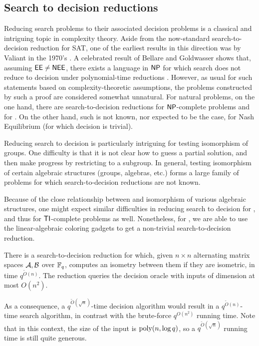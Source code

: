 \subsection{Search to decision reductions} 
Reducing search problems to their associated decision problems 
is a classical and intriguing topic in complexity 
theory. Aside from the now-standard search-to-decision reduction for SAT, one of the earliest results in this direction was by Valiant in the 1970's \cite{valiant}. A celebrated 
result of Bellare and Goldwasser shows that, assuming $\mathsf{EE}\neq\mathsf{NEE}$, there exists a language in $\mathsf{NP}$ for 
which search does not reduce to decision under polynomial-time reductions 
\cite{BG94}. 
However, as usual for such statements based on complexity-theoretic assumptions, 
the problems constructed by such a proof are considered somewhat unnatural. For 
natural problems, on the one hand, there are search-to-decision reductions for 
$\mathsf{NP}$-complete problems and for \GI. On the other hand, such is not 
known, nor expected to be the case, for Nash Equilibrium  \cite{CDT09} (for which decision is 
trivial). 

Reducing search to decision is particularly intriguing for testing isomorphism 
of groups. One difficulty is that it is not clear how to 
guess a partial solution, and then make progress by restricting to a 
subgroup. In general, testing isomorphism 
of certain algebraic structures (groups, algebras, etc.) forms a large family of 
problems 
for which search-to-decision reductions are not known.

Because of the close relationship between \ThreeTI and isomorphism of various 
algebraic structures, one might expect similar difficulties in reducing search to 
decision for \ThreeTI, 
and thus for $\mathsf{TI}$-complete problems as well. 
Nonetheless, for \AltMatSpIsomlong, we are able to use the linear-algebraic 
coloring gadgets to get a non-trivial search-to-decision reduction.

\begin{maintheorem}\label{thm:search_decision}
There is a search-to-decision reduction for \AltMatSpIsomlong which, given 
$n \times n$ alternating matrix spaces $\mathcal{A}, \mathcal{B}$ over $\mathbb{F}_q$,  computes an isometry between them if they are 
isometric, in time $q^{\tilde{O}(n)}$. The reduction queries the decision oracle 
with inputs of dimension at most $O(n^2)$.
\end{maintheorem}

As a consequence, a $q^{\tilde{O}(\sqrt{n})}$-time decision algorithm would result 
in a $q^{\tilde{O}(n)}$-time search algorithm, in contrast with the brute-force 
$q^{O(n^2)}$ running time. Note that in this context, the size of the input is 
$\mathrm{poly}(n,\log q)$, so a $q^{\tilde{O}(\sqrt{n})}$ running time is still quite 
generous.

